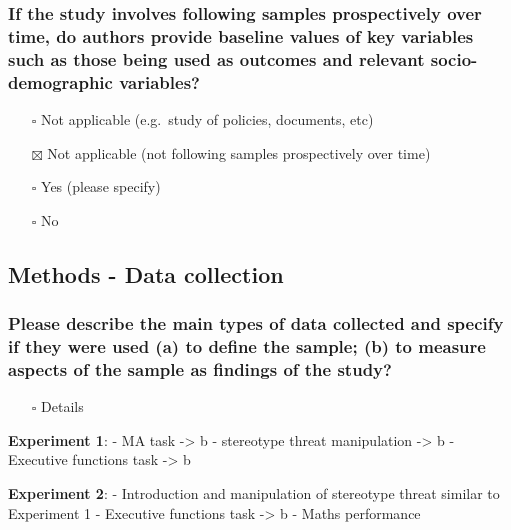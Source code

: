 \documentclass[
  doc, a4paper]{apa7}
\providecommand{\tightlist}{%
  \setlength{\itemsep}{0pt}\setlength{\parskip}{0pt}}
\begin{document}
\subsubsection{If the study involves following samples prospectively over time, do authors provide baseline values of key variables such as those being used as outcomes and relevant socio-demographic variables?}\label{if-the-study-involves-following-samples-prospectively-over-time-do-authors-provide-baseline-values-of-key-variables-such-as-those-being-used-as-outcomes-and-relevant-socio-demographic-variables}

\begin{itemize}
\tightlist
\item[$\square$]
  Not applicable (e.g.~study of policies, documents, etc)
\item[$\boxtimes$]
  Not applicable (not following samples prospectively over time)
\item[$\square$]
  Yes (please specify)
\item[$\square$]
  No
\end{itemize}

\subsection{Methods - Data collection}\label{methods---data-collection}

\subsubsection{Please describe the main types of data collected and specify if they were used (a) to define the sample; (b) to measure aspects of the sample as findings of the study?}\label{please-describe-the-main-types-of-data-collected-and-specify-if-they-were-used-a-to-define-the-sample-b-to-measure-aspects-of-the-sample-as-findings-of-the-study}

\begin{itemize}
\tightlist
\item[$\square$]
  Details
\end{itemize}

\textbf{Experiment 1}:
- MA task -\textgreater{} b
- stereotype threat manipulation -\textgreater{} b
- Executive functions task -\textgreater{} b

\textbf{Experiment 2}:
- Introduction and manipulation of stereotype threat similar to Experiment 1
- Executive functions task -\textgreater{} b
- Maths performance
\end{document}
